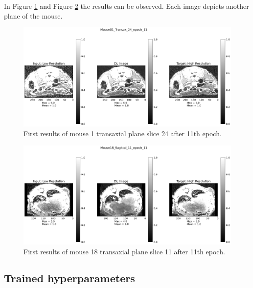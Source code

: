 \documentclass[twocolumn]{article}
\begin{document}
In Figure \ref{fig:transax1_first} and Figure \ref{fig:transax2_first} the results can be observed. 
Each image depicts another plane of the mouse.


\begin{figure}
    \centering
    \includegraphics[width=1\linewidth]{Mouse01_Transax_24_epoch_11.png}
    \caption{First results of mouse 1 transaxial plane slice 24 after 11th epoch.}
    \label{fig:transax1_first}
\end{figure}

\begin{figure}
    \centering
    \includegraphics[width=1\linewidth]{Mouse18_Sagittal_11_epoch_11.png}
    \caption{First results of mouse 18 transaxial plane slice 11 after 11th epoch.}
    \label{fig:transax2_first}
\end{figure}

\subsection{Trained hyperparameters}
\end{document}

